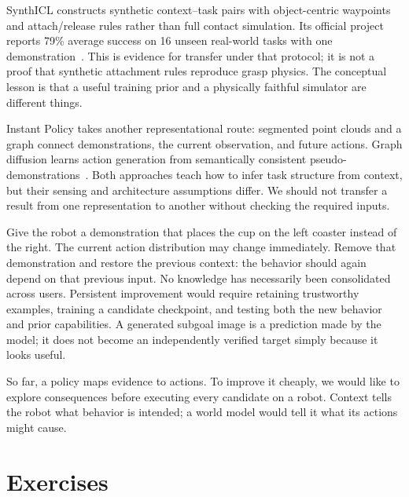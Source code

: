 SynthICL constructs synthetic context--task pairs with object-centric waypoints and attach/release rules rather than full contact simulation. Its official project reports 79\% average success on 16 unseen real-world tasks with one demonstration~\citep{synthiclproject}. This is evidence for transfer under that protocol; it is not a proof that synthetic attachment rules reproduce grasp physics. The conceptual lesson is that a useful training prior and a physically faithful simulator are different things.

Instant Policy takes another representational route: segmented point clouds and a graph connect demonstrations, the current observation, and future actions. Graph diffusion learns action generation from semantically consistent pseudo-demonstrations~\citep{instant}. Both approaches teach how to infer task structure from context, but their sensing and architecture assumptions differ. We should not transfer a result from one representation to another without checking the required inputs.

Give the robot a demonstration that places the cup on the left coaster instead of the right. The current action distribution may change immediately. Remove that demonstration and restore the previous context: the behavior should again depend on that previous input. No knowledge has necessarily been consolidated across users. Persistent improvement would require retaining trustworthy examples, training a candidate checkpoint, and testing both the new behavior and prior capabilities. A generated subgoal image is a prediction made by the model; it does not become an independently verified target simply because it looks useful.


So far, a policy maps evidence to actions. To improve it cheaply, we would like to explore consequences before executing every candidate on a robot. Context tells the robot what behavior is intended; a world model would tell it what its actions might cause.


\section{Exercises}
\FloatBarrier
